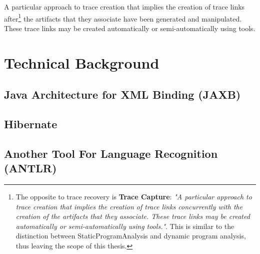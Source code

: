 \begin{definition}
A particular approach to trace creation that implies the creation of trace links after\footnote{The opposite to trace recovery is \textbf{Trace Capture}: \textit{"A particular approach to trace creation that implies the creation of trace links concurrently with the creation of the artifacts that they associate. These trace links may be created automatically or semi-automatically using tools."}\cite{DBLP:books/daglib/p/GotelCHZEGDAMM12}. This is similar to the distinction between \gls{StaticProgramAnalysis} and dynamic program analysis, thus leaving the scope of this thesis.} the artifacts that they associate have been generated and manipulated.
These trace links may be created automatically or semi-automatically using tools. 
\cite{DBLP:books/daglib/p/GotelCHZEGDAMM12}
\end{definition}


\section{Technical Background}


\subsection{\megalxtext}
\cite{DBLP:conf/sattose/BaggeZ14}
\cite{DBLP:journals/entcs/FavreN05}

\cite{DBLP:conf/ecmdafa/LammelV14}
\cite{DBLP:conf/models/FavreLV12}
\cite{DBLP:conf/sle/Lammel16}

\cite{LukasHaertelBScThesis}

\subsection{Java Architecture for XML Binding (JAXB)}

\subsection{Hibernate}

\subsection{Another Tool For Language Recognition (ANTLR)}
\cite{Parr:2013:DAR:2501720}

